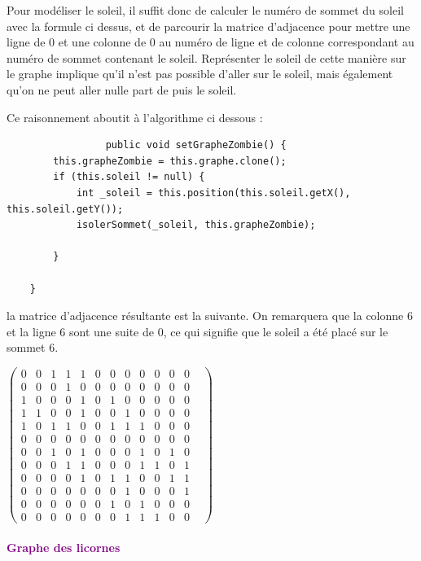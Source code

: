 \documentclass{report}
\begin{document}
				 Pour modéliser le soleil, il suffit donc de calculer le numéro de sommet du soleil avec la formule ci dessus, et de parcourir la matrice d'adjacence pour mettre une ligne de $0$ et une colonne de $0$ au numéro de ligne et de colonne correspondant au numéro de sommet contenant le soleil. Représenter le soleil de cette manière sur le graphe implique qu'il n'est pas possible d'aller sur le soleil, mais également qu'on ne peut aller nulle part de puis le soleil.
				 
				 Ce raisonnement aboutit à l'algorithme ci dessous :\\
				 
				 \begin{verbatim}
				 public void setGrapheZombie() {
        this.grapheZombie = this.graphe.clone();
        if (this.soleil != null) {
            int _soleil = this.position(this.soleil.getX(), this.soleil.getY());
            isolerSommet(_soleil, this.grapheZombie);

        }

    }
				\end{verbatim}
				
				la matrice d'adjacence résultante est la suivante. On remarquera que la colonne 6 et la ligne 6 sont une suite de 0, ce qui signifie que le soleil a été placé sur le sommet 6.\\
				\begin{center}
				\setcounter{MaxMatrixCols}{13}
				$\begin{pmatrix}
			0&0&1&1&1&0&0&0&0&0&0&0&\\
			0&0&0&1&0&0&0&0&0&0&0&0&\\
			1&0&0&0&1&0&1&0&0&0&0&0&\\
			1&1&0&0&1&0&0&1&0&0&0&0&\\
			1&0&1&1&0&0&1&1&1&0&0&0&\\
			0&0&0&0&0&0&0&0&0&0&0&0&\\
			0&0&1&0&1&0&0&0&1&0&1&0&\\
			0&0&0&1&1&0&0&0&1&1&0&1&\\
			0&0&0&0&1&0&1&1&0&0&1&1&\\
			0&0&0&0&0&0&0&1&0&0&0&1&\\
			0&0&0&0&0&0&1&0&1&0&0&0&\\
			0&0&0&0&0&0&0&1&1&1&0&0&
				\end{pmatrix}$	
				\end{center}
											  
				
			
			\paragraph{\textcolor{purple}{Graphe des licornes}}
			
\end{document}
